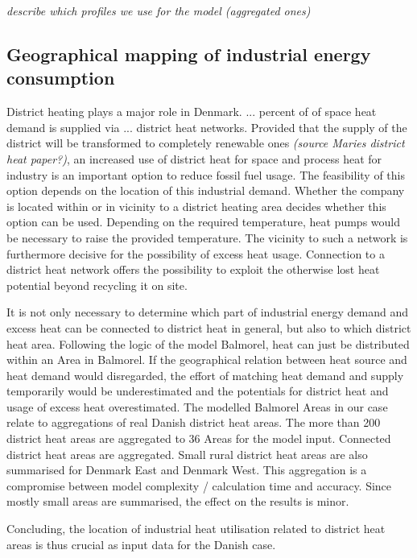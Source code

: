 \documentclass[review]{elsarticle}
\begin{document}
\textit{describe which profiles we use for the model (aggregated ones)}


\subsection{Geographical mapping of industrial energy consumption}

District heating plays a major role in Denmark. ... percent of of space heat demand is supplied via ... district heat networks. Provided that the supply of the district will be transformed to completely renewable ones \textit{(source Maries district heat paper?)}, an increased use of district heat for space and process heat for industry is an important option to reduce fossil fuel usage. The feasibility of this option depends on the location of this industrial demand. Whether the company is located within or in vicinity to a district heating area decides whether this option can be used. Depending on the required temperature, heat pumps would be necessary to raise the provided temperature. The vicinity to such a network is furthermore decisive for the possibility of excess heat usage. Connection to a district heat network offers the possibility to exploit the otherwise lost heat potential beyond recycling it on site.

It is not only necessary to determine which part of industrial energy demand and excess heat can be connected to district heat in general, but also to which district heat area. Following the logic of the model Balmorel, heat can just be distributed within an Area in Balmorel. If the geographical relation between heat source and heat demand would disregarded, the effort of matching heat demand and supply temporarily would be underestimated and the potentials for district heat and usage of excess heat overestimated. The modelled Balmorel Areas in our case relate to aggregations of real Danish district heat areas. The more than 200 district heat areas are aggregated to 36 Areas for the model input. Connected district heat areas are aggregated. Small rural district heat areas are also summarised for Denmark East and Denmark West. This aggregation is a compromise between model complexity / calculation time and accuracy. Since mostly small areas are summarised, the effect on the results is minor.

Concluding, the location of industrial heat utilisation related to district heat areas is thus crucial as input data for the Danish case.
\end{document}
